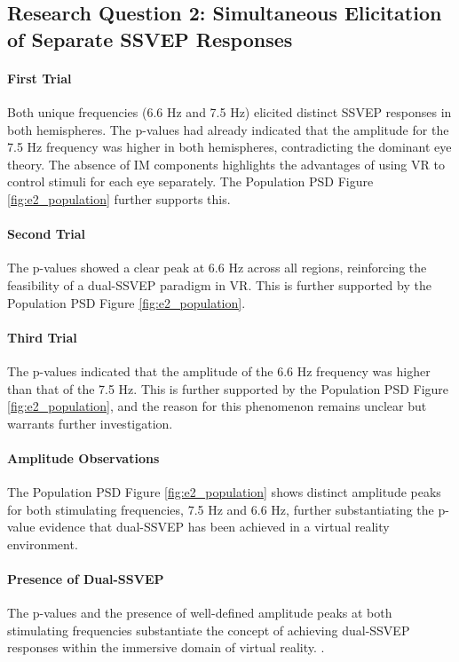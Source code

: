\subsection{Research Question 2: Simultaneous Elicitation of Separate SSVEP Responses}

\paragraph{First Trial}
Both unique frequencies (6.6 Hz and 7.5 Hz) elicited distinct SSVEP responses in both hemispheres. The p-values had already indicated that the amplitude for the 7.5 Hz frequency was higher in both hemispheres, contradicting the dominant eye theory. The absence of IM components highlights the advantages of using VR to control stimuli for each eye separately. The Population PSD Figure \ref{fig:e2_population} further supports this.

\paragraph{Second Trial}
The p-values showed a clear peak at 6.6 Hz across all regions, reinforcing the feasibility of a dual-SSVEP paradigm in VR. This is further supported by the Population PSD Figure \ref{fig:e2_population}.

\paragraph{Third Trial}
The p-values indicated that the amplitude of the 6.6 Hz frequency was higher than that of the 7.5 Hz. This is further supported by the Population PSD Figure \ref{fig:e2_population}, and the reason for this phenomenon remains unclear but warrants further investigation.

\paragraph{Amplitude Observations}
The Population PSD Figure \ref{fig:e2_population} shows distinct amplitude peaks for both stimulating frequencies, 7.5 Hz and 6.6 Hz, further substantiating the p-value evidence that dual-SSVEP has been achieved in a virtual reality environment.

\paragraph{Presence of Dual-SSVEP}
The p-values and the presence of well-defined amplitude peaks at both stimulating frequencies substantiate the concept of achieving dual-SSVEP responses within the immersive domain of virtual reality.
.

